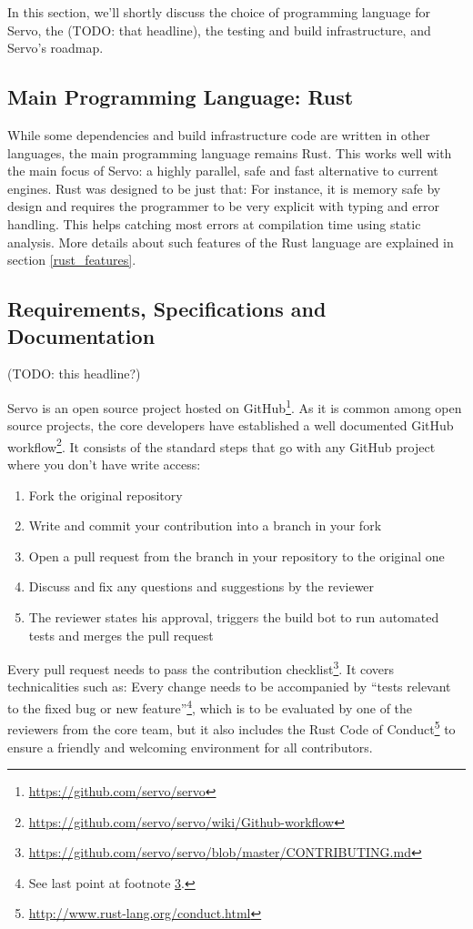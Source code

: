 \documentclass{scrartcl}
\newcommand{\todo}[1] {{\color{red}(TODO: #1)}}
\begin{document}
In this section, we'll shortly discuss the choice of programming language for Servo, the \todo{that headline}, the testing and build infrastructure, and Servo's roadmap.


\subsection{Main Programming Language: Rust}

While some dependencies and build infrastructure code are written in other languages, the main programming language remains Rust. This works well with the main focus of Servo: a highly parallel, safe and fast alternative to current engines. Rust was designed to be just that: For instance, it is memory safe by design and requires the programmer to be very explicit with typing and error handling. This helps catching most errors at compilation time using static analysis. More details about such features of the Rust language are explained in section \ref{rust_features}.


\subsection{Requirements, Specifications and Documentation}
\todo{this headline?}

Servo is an open source project hosted on GitHub\footnote{\url{https://github.com/servo/servo}}. As it is common among open source projects, the core developers have established a well documented GitHub workflow\footnote{\url{https://github.com/servo/servo/wiki/Github-workflow}}. It consists of the standard steps that go with any GitHub project where you don't have write access:
\begin{enumerate}
    \item Fork the original repository
    \item Write and commit your contribution into a branch in your fork
    \item Open a pull request from the branch in your repository to the original one
    \item Discuss and fix any questions and suggestions by the reviewer
    \item The reviewer states his approval, triggers the build bot to run automated tests and merges the pull request
\end{enumerate}

Every pull request needs to pass the contribution checklist\footnote{\label{contributing}\url{https://github.com/servo/servo/blob/master/CONTRIBUTING.md}}. It covers technicalities such as: Every change needs to be accompanied by ``tests relevant to the fixed bug or new feature''\footnote{See last point at footnote \ref{contributing}.},  which is to be evaluated by one of the reviewers from the core team, but it also includes the Rust Code of Conduct\footnote{\url{http://www.rust-lang.org/conduct.html}} to ensure a friendly and welcoming environment for all contributors.  \\
\end{document}
